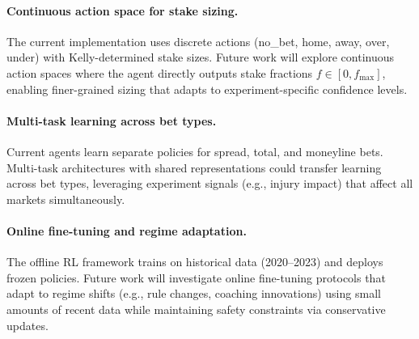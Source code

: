 \paragraph{Continuous action space for stake sizing.}
The current implementation uses discrete actions (no\_bet, home, away, over, under) with Kelly-determined stake sizes. Future work will explore continuous action spaces where the agent directly outputs stake fractions $f \in [0, f_{\max}]$, enabling finer-grained sizing that adapts to experiment-specific confidence levels.

\paragraph{Multi-task learning across bet types.}
Current agents learn separate policies for spread, total, and moneyline bets. Multi-task architectures with shared representations could transfer learning across bet types, leveraging experiment signals (e.g., injury impact) that affect all markets simultaneously.

\paragraph{Online fine-tuning and regime adaptation.}
The offline RL framework trains on historical data (2020--2023) and deploys frozen policies. Future work will investigate online fine-tuning protocols that adapt to regime shifts (e.g., rule changes, coaching innovations) using small amounts of recent data while maintaining safety constraints via conservative updates.